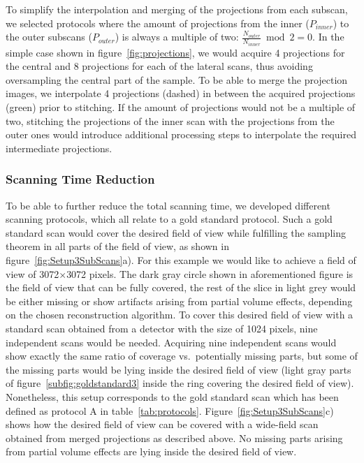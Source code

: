 To simplify the interpolation and merging of the projections from each subscan, we selected protocols where the amount of projections from the inner ($P_{inner}$) to the outer subscans ($P_{outer}$) is always a multiple of two: $\frac{N_{outer}}{N_{inner}} \bmod 2 = 0$. In the simple case shown in figure~\ref{fig:projections}, we would acquire 4 projections for the central and 8 projections for each of the lateral scans, thus avoiding oversampling the central part of the sample. To be able to merge the projection images, we interpolate 4 projections (dashed) in between the acquired projections (green) prior to stitching. If the amount of projections would not be a multiple of two, stitching the projections of the inner scan with the projections from the outer ones would introduce additional processing steps to interpolate the required intermediate projections.

\subsubsection{Scanning Time Reduction}%
To be able to further reduce the total scanning time, we developed different scanning protocols, which all relate to a gold standard protocol. Such a gold standard scan would cover the desired field of view while fulfilling the sampling theorem in all parts of the field of view, as shown in figure~\ref{fig:Setup3SubScans}a). For this example we would like to achieve a field of view of 3072$\times$3072 pixels. The dark gray circle shown in aforementioned figure is the field of view that can be fully covered, the rest of the slice in light grey would be either missing or show artifacts arising from partial volume effects, depending on the chosen reconstruction algorithm. To cover this desired field of view with a standard scan obtained from a detector with the size of 1024 pixels, nine independent scans would be needed. Acquiring nine independent scans would show exactly the same ratio of coverage vs.\ potentially missing parts, but some of the missing parts would be lying inside the desired field of view (light gray parts of figure~\ref{subfig:goldstandard3} inside the ring covering the desired field of view). Nonetheless, this setup corresponds to the gold standard scan which has been defined as protocol A in table~\ref{tab:protocols}. Figure~\ref{fig:Setup3SubScans}c) shows how the desired field of view can be covered with a wide-field scan obtained from merged projections as described above. No missing parts arising from partial volume effects are lying inside the desired field of view.

